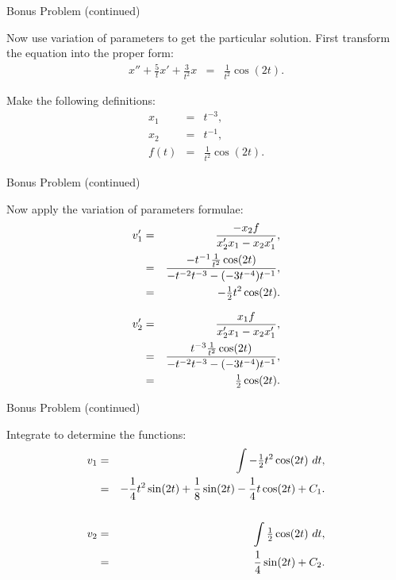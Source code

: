 \begin{frame}{Bonus Problem (continued)}

  Now use variation of parameters to get the particular
  solution. First transform the equation into the proper form:
  \begin{eqnarray*}
    x'' + \frac{5}{t} x' + \frac{3}{t^2} x & = & \frac{1}{t^2} \cos(2t).
  \end{eqnarray*}

  Make the following definitions:
  \begin{eqnarray*}
    x_1 & = & t^{-3}, \\
    x_2 & = & t^{-1}, \\
    f(t) & = & \frac{1}{t^2} \cos(2t).
  \end{eqnarray*}

\end{frame}

\begin{frame}{Bonus Problem (continued)}

  Now apply the variation of parameters formulae:
  \begin{eqnarray*}
    v_1' & = & \frac{-x_2 f}{x_2' x_1 - x_2 x_1'}, \\
    & = & \frac{-t^{-1} \frac{1}{t^2} \cos(2t)}{-t^{-2} t^{-3} - (-3t^{-4}) t^{-1}}, \\
    & = & -\mbox{$\frac{1}{2}$} t^2 \cos(2t).
  \end{eqnarray*}

  \begin{eqnarray*}
    v_2' & = & \frac{x_1 f}{x_2' x_1 - x_2 x_1'}, \\
    & = & \frac{t^{-3} \frac{1}{t^2} \cos(2t)}{-t^{-2} t^{-3} - (-3t^{-4}) t^{-1}}, \\
    & = & \mbox{$\frac{1}{2}$} \cos(2t).
  \end{eqnarray*}


\end{frame}


\begin{frame}{Bonus Problem (continued)}

  Integrate to determine the functions:
  \begin{eqnarray*}
    v_1 & = & \int -\mbox{$\frac{1}{2}$} t^2 \cos(2t) ~ dt, \\
    & = & -\frac{1}{4} t^2 \sin(2t) + \frac{1}{8} \sin(2t) - \frac{1}{4} t \cos(2t) + C_1. \\
    ~ \\
    v_2 & = & \int \mbox{$\frac{1}{2}$} \cos(2t) ~ dt, \\
    & = & \frac{1}{4} \sin(2t) + C_2.
  \end{eqnarray*}


\end{frame}

